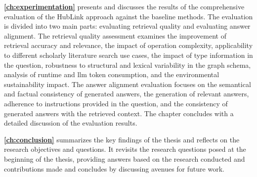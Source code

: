\textbf{\autoref{ch:experimentation}} presents and discusses the results of the comprehensive evaluation of the HubLink approach against the baseline methods. The evaluation is divided into two main parts: evaluating retrieval quality and evaluating answer alignment. The retrieval quality assessment examines the improvement of retrieval accuracy and relevance, the impact of operation complexity, applicability to different scholarly literature search use cases, the impact of type information in the question, robustness to structural and lexical variability in the graph schema, analysis of runtime and \gls{llm} token consumption, and the environmental sustainability impact. The answer alignment evaluation focuses on the semantical and factual consistency of generated answers, the generation of relevant answers, adherence to instructions provided in the question, and the consistency of generated answers with the retrieved context. The chapter concludes with a detailed discussion of the evaluation results.

\textbf{\autoref{ch:conclusion}} summarizes the key findings of the thesis and reflects on the research objectives and questions. It revisits the research questions posed at the beginning of the thesis, providing answers based on the research conducted and contributions made and concludes by discussing avenues for future work.